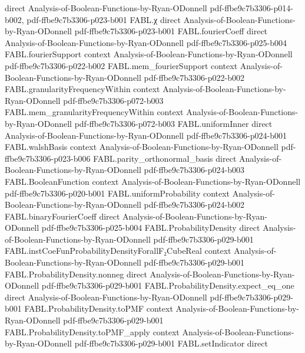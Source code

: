 \begin{theorem}
  {direct}
  {Analysis-of-Boolean-Functions-by-Ryan-ODonnell}
  {pdf-ffbe9c7b3306-p014-b002,
    pdf-ffbe9c7b3306-p023-b001}
\proofstep
  {FABL.χ}
  {direct}
  {Analysis-of-Boolean-Functions-by-Ryan-ODonnell}
  {pdf-ffbe9c7b3306-p023-b001}
\proofstep
  {FABL.fourierCoeff}
  {direct}
  {Analysis-of-Boolean-Functions-by-Ryan-ODonnell}
  {pdf-ffbe9c7b3306-p025-b004}
\proofstep
  {FABL.fourierSupport}
  {context}
  {Analysis-of-Boolean-Functions-by-Ryan-ODonnell}
  {pdf-ffbe9c7b3306-p022-b002}
\proofstep
  {FABL.mem_fourierSupport}
  {context}
  {Analysis-of-Boolean-Functions-by-Ryan-ODonnell}
  {pdf-ffbe9c7b3306-p022-b002}
\proofstep
  {FABL.granularityFrequencyWithin}
  {context}
  {Analysis-of-Boolean-Functions-by-Ryan-ODonnell}
  {pdf-ffbe9c7b3306-p072-b003}
\proofstep
  {FABL.mem_granularityFrequencyWithin}
  {context}
  {Analysis-of-Boolean-Functions-by-Ryan-ODonnell}
  {pdf-ffbe9c7b3306-p072-b003}
\proofstep
  {FABL.uniformInner}
  {direct}
  {Analysis-of-Boolean-Functions-by-Ryan-ODonnell}
  {pdf-ffbe9c7b3306-p024-b001}
\proofstep
  {FABL.walshBasis}
  {context}
  {Analysis-of-Boolean-Functions-by-Ryan-ODonnell}
  {pdf-ffbe9c7b3306-p023-b006}
\proofstep
  {FABL.parity_orthonormal_basis}
  {direct}
  {Analysis-of-Boolean-Functions-by-Ryan-ODonnell}
  {pdf-ffbe9c7b3306-p024-b003}
\proofstep
  {FABL.BooleanFunction}
  {context}
  {Analysis-of-Boolean-Functions-by-Ryan-ODonnell}
  {pdf-ffbe9c7b3306-p020-b001}
\proofstep
  {FABL.uniformProbability}
  {context}
  {Analysis-of-Boolean-Functions-by-Ryan-ODonnell}
  {pdf-ffbe9c7b3306-p024-b002}
\proofstep
  {FABL.binaryFourierCoeff}
  {direct}
  {Analysis-of-Boolean-Functions-by-Ryan-ODonnell}
  {pdf-ffbe9c7b3306-p025-b004}
\proofstep
  {FABL.ProbabilityDensity}
  {direct}
  {Analysis-of-Boolean-Functions-by-Ryan-ODonnell}
  {pdf-ffbe9c7b3306-p029-b001}
\proofstep
  {FABL.instCoeFunProbabilityDensityForallF₂CubeReal}
  {context}
  {Analysis-of-Boolean-Functions-by-Ryan-ODonnell}
  {pdf-ffbe9c7b3306-p029-b001}
\proofstep
  {FABL.ProbabilityDensity.nonneg}
  {direct}
  {Analysis-of-Boolean-Functions-by-Ryan-ODonnell}
  {pdf-ffbe9c7b3306-p029-b001}
\proofstep
  {FABL.ProbabilityDensity.expect_eq_one}
  {direct}
  {Analysis-of-Boolean-Functions-by-Ryan-ODonnell}
  {pdf-ffbe9c7b3306-p029-b001}
\proofstep
  {FABL.ProbabilityDensity.toPMF}
  {context}
  {Analysis-of-Boolean-Functions-by-Ryan-ODonnell}
  {pdf-ffbe9c7b3306-p029-b001}
\proofstep
  {FABL.ProbabilityDensity.toPMF_apply}
  {context}
  {Analysis-of-Boolean-Functions-by-Ryan-ODonnell}
  {pdf-ffbe9c7b3306-p029-b001}
\proofstep
  {FABL.setIndicator}
  {direct}

\end{theorem}
